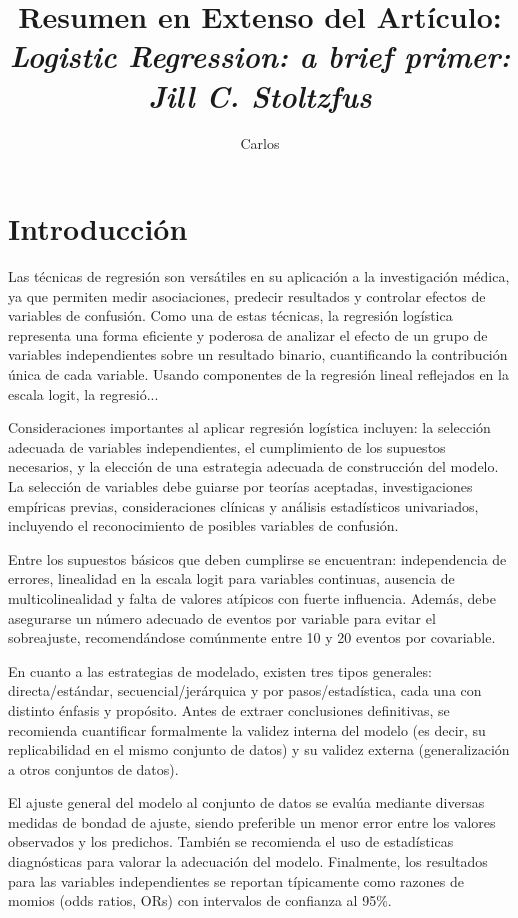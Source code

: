\documentclass[12pt]{article}
\title{Resumen en Extenso del Art\'iculo: \\
\textit{Logistic Regression: a brief primer: Jill C. Stoltzfus}}
\author{Carlos}
\date{}
\begin{document}
\maketitle
\tableofcontents



\section*{Introducci\'on}

Las técnicas de regresión son versátiles en su aplicación a la investigación médica, ya que permiten medir asociaciones, predecir resultados y controlar efectos de variables de confusión. Como una de estas técnicas, la regresión logística representa una forma eficiente y poderosa de analizar el efecto de un grupo de variables independientes sobre un resultado binario, cuantificando la contribución única de cada variable. Usando componentes de la regresión lineal reflejados en la escala logit, la regresió...

Consideraciones importantes al aplicar regresión logística incluyen: la selección adecuada de variables independientes, el cumplimiento de los supuestos necesarios, y la elección de una estrategia adecuada de construcción del modelo. La selección de variables debe guiarse por teorías aceptadas, investigaciones empíricas previas, consideraciones clínicas y análisis estadísticos univariados, incluyendo el reconocimiento de posibles variables de confusión.

Entre los supuestos básicos que deben cumplirse se encuentran: independencia de errores, linealidad en la escala logit para variables continuas, ausencia de multicolinealidad y falta de valores atípicos con fuerte influencia. Además, debe asegurarse un número adecuado de eventos por variable para evitar el sobreajuste, recomendándose comúnmente entre 10 y 20 eventos por covariable.

En cuanto a las estrategias de modelado, existen tres tipos generales: directa/estándar, secuencial/jerárquica y por pasos/estadística, cada una con distinto énfasis y propósito. Antes de extraer conclusiones definitivas, se recomienda cuantificar formalmente la validez interna del modelo (es decir, su replicabilidad en el mismo conjunto de datos) y su validez externa (generalización a otros conjuntos de datos).

El ajuste general del modelo al conjunto de datos se evalúa mediante diversas medidas de bondad de ajuste, siendo preferible un menor error entre los valores observados y los predichos. También se recomienda el uso de estadísticas diagnósticas para valorar la adecuación del modelo. Finalmente, los resultados para las variables independientes se reportan típicamente como razones de momios (odds ratios, ORs) con intervalos de confianza al 95\%.
\end{document}
